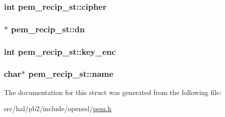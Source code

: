 \subsubsection[{\texorpdfstring{cipher}{cipher}}]{\setlength{\rightskip}{0pt plus 5cm}int pem\+\_\+recip\+\_\+st\+::cipher}\hypertarget{structpem__recip__st_aacc99505c76644287f2b94c986349f16}{}\label{structpem__recip__st_aacc99505c76644287f2b94c986349f16}
\subsubsection[{\texorpdfstring{dn}{dn}}]{$\ast$ pem\+\_\+recip\+\_\+st\+::dn}\hypertarget{structpem__recip__st_a7087e450cc6060c055c430535b0df70e}{}\label{structpem__recip__st_a7087e450cc6060c055c430535b0df70e}
\subsubsection[{\texorpdfstring{key\+\_\+enc}{key_enc}}]{\setlength{\rightskip}{0pt plus 5cm}int pem\+\_\+recip\+\_\+st\+::key\+\_\+enc}\hypertarget{structpem__recip__st_a10d41030c038defd986f740d1663b831}{}\label{structpem__recip__st_a10d41030c038defd986f740d1663b831}
\subsubsection[{\texorpdfstring{name}{name}}]{\setlength{\rightskip}{0pt plus 5cm}char$\ast$ pem\+\_\+recip\+\_\+st\+::name}\hypertarget{structpem__recip__st_a01cd4e55a392b7bc9c91f543800a7347}{}\label{structpem__recip__st_a01cd4e55a392b7bc9c91f543800a7347}


The documentation for this struct was generated from the following file\+:\begin{DoxyCompactItemize}
\item 
src/hal/pb2/include/openssl/\hyperlink{pem_8h}{pem.\+h}\end{DoxyCompactItemize}
